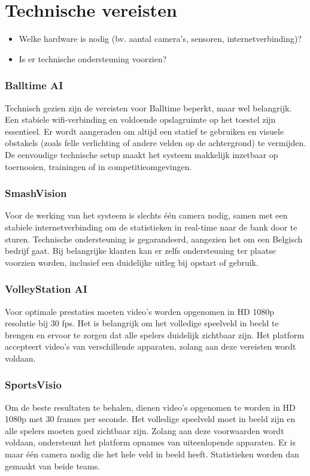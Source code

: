 \section{Technische vereisten}
\begin{itemize}
  \item Welke hardware is nodig (bv. aantal camera’s, sensoren, internetverbinding)?
  \item Is er technische ondersteuning voorzien?
\end{itemize}
\subsubsection{Balltime AI}
Technisch gezien zijn de vereisten voor Balltime beperkt, maar wel belangrijk. Een stabiele wifi-verbinding en voldoende opslagruimte op het toestel zijn essentieel. Er wordt aangeraden om altijd een statief te gebruiken en visuele obstakels (zoals felle verlichting of andere velden op de achtergrond) te vermijden. De eenvoudige technische setup maakt het systeem makkelijk inzetbaar op toernooien, trainingen of in competitieomgevingen. \autocite{BalltimeAI2025}
\subsubsection{SmashVision}
Voor de werking van het systeem is slechts één camera nodig, samen met een stabiele internetverbinding om de statistieken in real-time naar de bank door te sturen. Technische ondersteuning is gegarandeerd, aangezien het om een Belgisch bedrijf gaat. Bij belangrijke klanten kan er zelfs ondersteuning ter plaatse voorzien worden, inclusief een duidelijke uitleg bij opstart of gebruik. \autocite{Doren2025}
\subsubsection{VolleyStation AI}
Voor optimale prestaties moeten video's worden opgenomen in HD 1080p resolutie bij 30 fps. Het is belangrijk om het volledige speelveld in beeld te brengen en ervoor te zorgen dat alle spelers duidelijk zichtbaar zijn. Het platform accepteert video's van verschillende apparaten, zolang aan deze vereisten wordt voldaan. \autocite{VolleyStationAI2025} 
\subsubsection{SportsVisio}
Om de beste resultaten te behalen, dienen video's opgenomen te worden in HD 1080p met 30 frames per seconde. Het volledige speelveld moet in beeld zijn en alle spelers moeten goed zichtbaar zijn. Zolang aan deze voorwaarden wordt voldaan, ondersteunt het platform opnames van uiteenlopende apparaten.\autocite{SportsVisio2025} Er is maar één camera nodig die het hele veld in beeld heeft. Statistieken worden dan gemaakt van beide teams. \autocite{Basaranlar2025}

